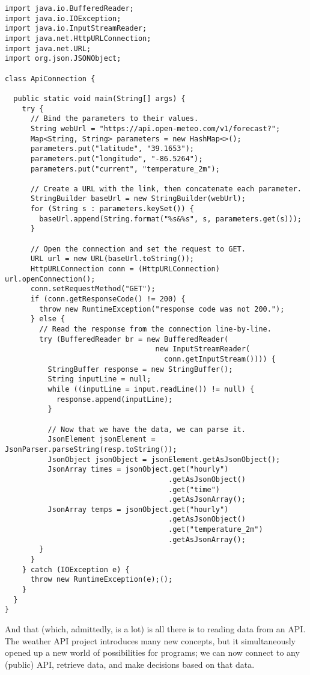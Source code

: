 \newpage %

\begin{lstlisting}[language=MyJava]
import java.io.BufferedReader;
import java.io.IOException;
import java.io.InputStreamReader;
import java.net.HttpURLConnection;
import java.net.URL;
import org.json.JSONObject;

class ApiConnection {

  public static void main(String[] args) {
    try {
      // Bind the parameters to their values.
      String webUrl = "https://api.open-meteo.com/v1/forecast?";
      Map<String, String> parameters = new HashMap<>();
      parameters.put("latitude", "39.1653");
      parameters.put("longitude", "-86.5264");
      parameters.put("current", "temperature_2m");

      // Create a URL with the link, then concatenate each parameter.
      StringBuilder baseUrl = new StringBuilder(webUrl);
      for (String s : parameters.keySet()) { 
        baseUrl.append(String.format("%s&%s", s, parameters.get(s))); 
      }
    
      // Open the connection and set the request to GET.
      URL url = new URL(baseUrl.toString());
      HttpURLConnection conn = (HttpURLConnection) url.openConnection();
      conn.setRequestMethod("GET");
      if (conn.getResponseCode() != 200) {
        throw new RuntimeException("response code was not 200.");
      } else {
        // Read the response from the connection line-by-line.
        try (BufferedReader br = new BufferedReader(
                                   new InputStreamReader(
                                     conn.getInputStream()))) {
          StringBuffer response = new StringBuffer();
          String inputLine = null;
          while ((inputLine = input.readLine()) != null) {
            response.append(inputLine); 
          }

          // Now that we have the data, we can parse it.
          JsonElement jsonElement = JsonParser.parseString(resp.toString());
          JsonObject jsonObject = jsonElement.getAsJsonObject();
          JsonArray times = jsonObject.get("hourly")
                                      .getAsJsonObject()
                                      .get("time")
                                      .getAsJsonArray();
          JsonArray temps = jsonObject.get("hourly")
                                      .getAsJsonObject()
                                      .get("temperature_2m")
                                      .getAsJsonArray();
        }
      }
    } catch (IOException e) {
      throw new RuntimeException(e);();
    }
  }
}
\end{lstlisting}

And that (which, admittedly, is a lot) is all there is to reading data from an API. 
The weather API project introduces many new concepts, but it simultaneously opened up a new world of possibilities for programs; we can now connect to any (public) API, retrieve data, and make decisions based on that data.